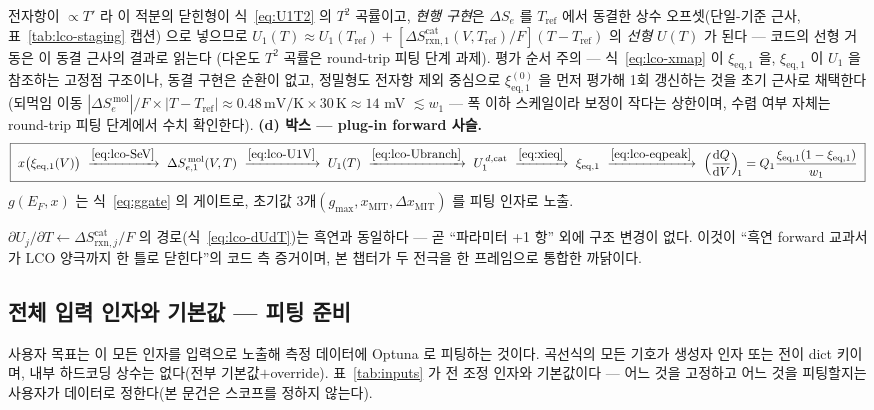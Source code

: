 \documentclass[11pt,a4paper]{article}
\newcommand{\dd}{\mathrm{d}}
\newcommand{\eq}{\mathrm{eq}}
\newcommand{\rxn}{\mathrm{rxn}}
\begin{document}
\begin{enumerate}[label=(\roman*),leftmargin=2.2em,itemsep=1pt]
\begin{equation}
\label{eq:lco-U1V}
\end{equation}
전자항이 $\propto T'$ 라 이 적분의 닫힌형이 식~\eqref{eq:U1T2} 의 $T^2$ 곡률이고, \emph{현행 구현}은
$\Delta S_e$ 를 $T_\mathrm{ref}$ 에서 동결한 상수 오프셋(단일-기준 근사, 표~\ref{tab:lco-staging} 캡션)
으로 넣으므로 $U_1(T)\approx U_1(T_\mathrm{ref})+[\Delta S_{\rxn,1}^\mathrm{cat}(V,T_\mathrm{ref})/F]
(T-T_\mathrm{ref})$ 의 \emph{선형} $U(T)$ 가 된다 — 코드의 선형 거동은 이 동결 근사의 결과로 읽는다
(다온도 $T^2$ 곡률은 round-trip 피팅 단계 과제). 평가 순서 주의 — 식~\eqref{eq:lco-xmap} 이
$\xi_{\eq,1}$ 을, $\xi_{\eq,1}$ 이 $U_1$ 을 참조하는 고정점 구조이나, 동결 구현은 순환이 없고, 정밀형도
전자항 제외 중심으로 $\xi_{\eq,1}^{(0)}$ 을 먼저 평가해 1회 갱신하는 것을 초기 근사로 채택한다(되먹임
이동 $|\Delta S_e^{\,\mathrm{mol}}|/F\times|T-T_\mathrm{ref}|\approx0.48\,\mathrm{mV/K}\times30\,\mathrm K
\approx14$ mV $\lesssim w_1$ — 폭 이하 스케일이라 보정이 작다는 상한이며, 수렴 여부 자체는 round-trip
피팅 단계에서 수치 확인한다). \textbf{(d) 박스 — plug-in forward 사슬.}
\begin{equation}
\boxed{\;x\big(\xi_{\eq,1}(V)\big)\ \xrightarrow{\eqref{eq:lco-SeV}}\ \Delta S_{e,1}^{\,\mathrm{mol}}(V,T)
\ \xrightarrow{\eqref{eq:lco-U1V}}\ U_1(T)\ \xrightarrow{\eqref{eq:lco-Ubranch}}\ U_1^{\,d,\mathrm{cat}}
\ \xrightarrow{\eqref{eq:xieq}}\ \xi_{\eq,1}\ \xrightarrow{\eqref{eq:lco-eqpeak}}\
\Big(\frac{\dd Q}{\dd V}\Big)_{\!1}=Q_1\frac{\xi_{\eq,1}(1-\xi_{\eq,1})}{w_1}\;}
\label{eq:lco-plugin}
\end{equation}
$g(E_F,x)$ 는 식~\eqref{eq:ggate} 의 게이트로, 초기값 3개$(g_{\max},x_\mathrm{MIT},\Delta x_\mathrm{MIT})$
를 피팅 인자로 노출.
\end{enumerate}
$\partial U_j/\partial T\leftarrow\Delta S_{\rxn,j}^\mathrm{cat}/F$ 의 경로(식~\eqref{eq:lco-dUdT})는 흑연과 동일하다 —
곧 ``파라미터 +1 항'' 외에 구조 변경이 없다. 이것이 ``흑연 forward 교과서가 LCO 양극까지 한 틀로 닫힌다''의 코드 측
증거이며, 본 챕터가 두 전극을 한 프레임으로 통합한 까닭이다.

\subsection{전체 입력 인자와 기본값 — 피팅 준비}
사용자 목표는 이 모든 인자를 입력으로 노출해 측정 데이터에 Optuna 로 피팅하는 것이다. 곡선식의 모든 기호가 생성자 인자
또는 전이 dict 키이며, 내부 하드코딩 상수는 없다(전부 기본값$+$override). 표~\ref{tab:inputs} 가 전 조정 인자와
기본값이다 — 어느 것을 고정하고 어느 것을 피팅할지는 사용자가 데이터로 정한다(본 문건은 스코프를 정하지 않는다).
\end{document}

